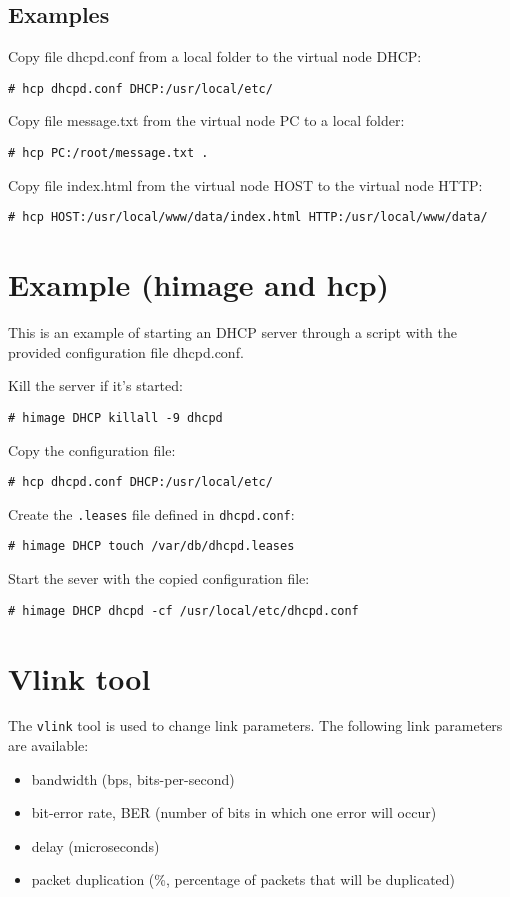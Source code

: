 \subsection{Examples}

Copy file dhcpd.conf from a local folder to the virtual node DHCP:

\texttt{\# hcp dhcpd.conf DHCP:/usr/local/etc/} \hfill

Copy file message.txt from the virtual node PC to a local folder:

\texttt{\# hcp PC:/root/message.txt .} \hfill

Copy file index.html from the virtual node HOST to the virtual node HTTP:

\texttt{\# hcp HOST:/usr/local/www/data/index.html HTTP:/usr/local/www/data/} \hfill

\section{Example (himage and hcp)}

This is an example of starting an DHCP server through a script with the
provided configuration file dhcpd.conf.

Kill the server if it's started:

\texttt{\# himage DHCP killall -9 dhcpd} \hfill

Copy the configuration file:

\texttt{\# hcp dhcpd.conf DHCP:/usr/local/etc/} \hfill

Create the \texttt{.leases} file defined in \texttt{dhcpd.conf}:

\texttt{\# himage DHCP touch /var/db/dhcpd.leases} \hfill

Start the sever with the copied configuration file:

\texttt{\# himage DHCP dhcpd -cf /usr/local/etc/dhcpd.conf} \hfill

\section{Vlink tool}

The \texttt{vlink} tool is used to change link parameters. The following link parameters are available:
\begin{itemize}
	\item bandwidth (bps, bits-per-second)
	\item bit-error rate, BER (number of bits in which one error will occur)
	\item delay (microseconds)
	\item packet duplication (\%, percentage of packets that will be duplicated)
\end{itemize}

